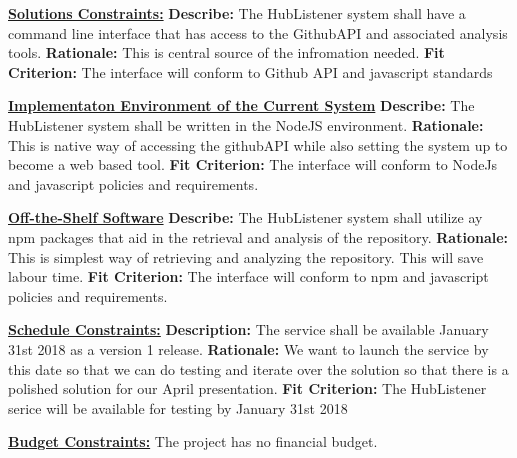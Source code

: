 \documentclass{article}
\begin{document}
\noindent
\textbf{\underline{Solutions Constraints:}}\newline
\textbf{Describe:}  The HubListener system shall have a command line interface that has access to the GithubAPI and associated analysis tools.\newline
\textbf{Rationale:} This is central source of the infromation needed. \newline
\textbf{Fit Criterion:}  The interface will conform to Github API and javascript standards \newline

\noindent
\textbf{\underline{Implementaton Environment of the Current System}}\newline
\textbf{Describe:}  The HubListener system shall be written in the NodeJS environment.\newline
\textbf{Rationale:} This is native way of accessing the githubAPI while also setting the system up to become a web based tool.\newline 
\textbf{Fit Criterion:}  The interface will conform to NodeJs and javascript policies and requirements. \newline

\noindent
\textbf{\underline{Off-the-Shelf Software}}\newline
\textbf{Describe:}  The HubListener system shall utilize ay npm packages that aid in the retrieval and analysis of the repository. \newline
\textbf{Rationale:}  This is simplest way of retrieving and analyzing the repository. This will save labour time.\newline
\textbf{Fit Criterion:}  The interface will conform to npm and javascript policies and requirements. \newline

\noindent
\textbf{\underline{Schedule Constraints:}}\newline
\textbf{Description:} The service shall be available January 31st 2018 as a version 1 release.\newline
\textbf{Rationale:} We want to launch the service by this date so that we can do testing and iterate over the solution so that there is a polished solution for our April presentation.\newline
\textbf{Fit Criterion:} The HubListener serice will be available for testing by January 31st 2018 \newline

\noindent
\textbf{\underline{Budget Constraints:}} 
The project has no financial budget. 
\end{document}

